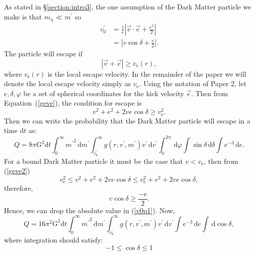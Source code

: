 \documentclass[aps,floatfix,prd,showpacs]{revtex4}
\newcommand{\diff}{\mathrm{d}}
\newcommand{\vesc}{v_{\text{e}}}
\newcommand{\vp}{v^\prime}
\newcommand{\mpr}{m^\prime}
\newcommand{\G}{\text{G}}
\newcommand{\mx}{m_\chi}
\begin{document}
As stated in \S\ref{section:intro3}, the one assumption of the Dark Matter particle we make is that $\mx \ll \mpr$ so 
%
\begin{equation}
\label{v0p1}
\begin{split}
\vp_0 &= \frac{1}{e}|\vec{v}\cdot\vec{e} + \frac{e^2}{2}| \\
&= |v\cos\delta + \frac{e}{2}|.
\end{split}
\end{equation}
%
%
The particle will escape if 
%
\begin{equation}
|\vec{v}+\vec{e}| \ge \vesc(r),
\label{geve}
\end{equation}
%
%
where $\vesc(r)$ is the local escape velocity. In the remainder of the paper we will denote the local escape velocity simply as $\vesc$. Using the notation of Paper 2, let $e, \delta, \varphi$ be a set of spherical coordinates for the kick velocity $\vec{e}$. Then from Equation~(\ref{geve}), the condition for escape is
%
% 
\begin{equation}
\label{geve2}
v^2 + e^2 + 2ve\cos\delta \ge \vesc^2.
\end{equation}
Then we can write the probability that the Dark Matter particle will escape in a time d$t$ as:
%
\begin{equation}
Q = 8\pi\G^2\diff t\int^\infty_0 {\mpr}^2\,\diff \mpr\int^\infty_{\vp_0}g(r,\vp,\mpr)\vp\,\diff \vp\int^{2\pi}_0{}\,\diff \varphi\int{\sin\delta}\,\diff \delta\int{e^{-3}}\,\diff e.
\end{equation}
%
%
For a bound Dark Matter particle it must be the case that $v < \vesc$, then from (\ref{geve2})
%
\begin{equation}
\vesc^2 \le v^2 + e^2 + 2ve\cos\delta \le \vesc^2 + e^2 + 2ve\cos\delta,
\end{equation}
%
%
therefore,
%
\begin{equation}
v\cos\delta \ge \frac{-e}{2}.
\end{equation}
%
%
Hence, we can drop the absolute value in (\ref{v0p1}). Now,
%
\begin{equation}
Q = 16\pi^2\G^2\diff t\int^\infty_0{\mpr}^2\,\diff \mpr\int^\infty_{\vp_0}{g(r,\vp,\mpr)\vp}\,\diff \vp\int{e^{-3}}\,\diff e\int{}\,\diff \cos\delta,
\end{equation}
%
%
where integration should satisfy:
%
\begin{equation}
-1 \le \cos\delta \le 1
\label{lim1}
\end{equation}
\end{document}
